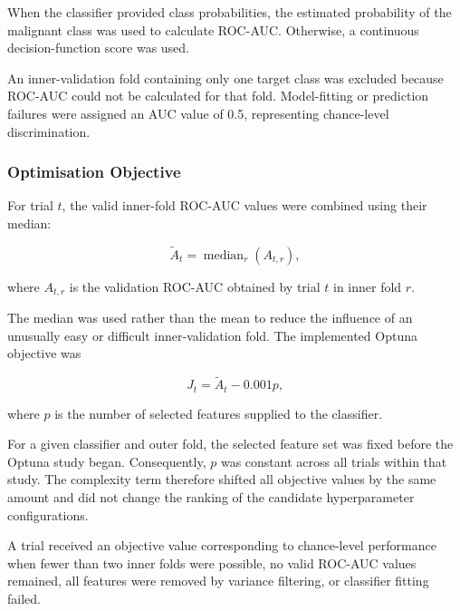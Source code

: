 \documentclass[12pt,twocolumn]{article}
\begin{document}
When the classifier provided class probabilities, the estimated
probability of the malignant class was used to calculate ROC-AUC.
Otherwise, a continuous decision-function score was used.

An inner-validation fold containing only one target class was excluded
because ROC-AUC could not be calculated for that fold. Model-fitting or
prediction failures were assigned an AUC value of 0.5, representing
chance-level discrimination.








\subsubsection{Optimisation Objective}
\label{subsubsec:optuna_objective}

For trial \(t\), the valid inner-fold ROC-AUC values were combined
using their median:

\begin{equation}
\widetilde{A}_t
=
\operatorname{median}_{r}
\left(
A_{t,r}
\right),
\label{eq:median_inner_auc}
\end{equation}

where \(A_{t,r}\) is the validation ROC-AUC obtained by trial \(t\)
in inner fold \(r\).

The median was used rather than the mean to reduce the influence of an
unusually easy or difficult inner-validation fold. The implemented
Optuna objective was

\begin{equation}
J_t
=
\widetilde{A}_t
-
0.001p,
\label{eq:optuna_objective}
\end{equation}

where \(p\) is the number of selected features supplied to the
classifier.

For a given classifier and outer fold, the selected feature set was
fixed before the Optuna study began. Consequently, \(p\) was constant
across all trials within that study. The complexity term therefore
shifted all objective values by the same amount and did not change the
ranking of the candidate hyperparameter configurations.

A trial received an objective value corresponding to chance-level
performance when fewer than two inner folds were possible, no valid
ROC-AUC values remained, all features were removed by variance
filtering, or classifier fitting failed.
\end{document}
